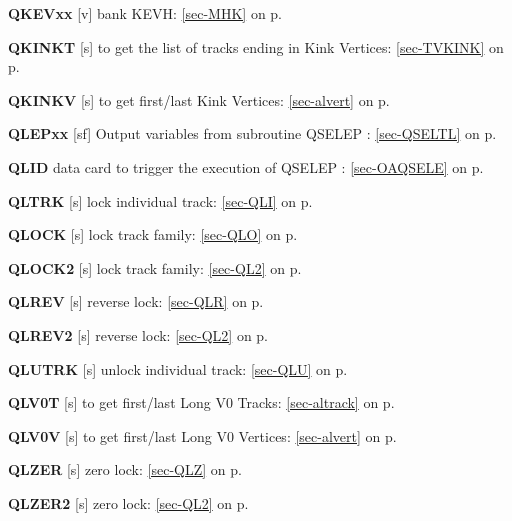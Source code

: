  \item{\bf QKEVxx  }[v] bank KEVH: \ref{sec-MHK} on p.~\pageref{sec-MHK}
 
 \item{\bf QKINKT  }[s] to get the list of tracks ending in Kink Vertices: \ref{sec-TVKINK} on p.~\pageref{sec-TVKINK}
 
 \item{\bf QKINKV  }[s] to get first/last Kink Vertices: \ref{sec-alvert} on p.~\pageref{sec-alvert}
 
 \item{\bf QLEPxx  }[sf] Output variables from subroutine QSELEP : \ref{sec-QSELTL} on p.~\pageref{sec-QSELTL}\\
 \item{\bf QLID } data card to trigger the execution of QSELEP : \ref{sec-OAQSELE} on p.~\pageref{sec-OAQSELE}\\
 \item{\bf QLTRK   }[s] lock individual track: \ref{sec-QLI} on p.~\pageref{sec-QLI}\\
 \item{\bf QLOCK   }[s] lock track family: \ref{sec-QLO} on p.~\pageref{sec-QLO}\\
 \item{\bf QLOCK2  }[s] lock track family: \ref{sec-QL2} on p.~\pageref{sec-QL2}\\
 \item{\bf QLREV   }[s] reverse lock: \ref{sec-QLR} on p.~\pageref{sec-QLR}\\
 \item{\bf QLREV2  }[s] reverse lock: \ref{sec-QL2} on p.~\pageref{sec-QL2}\\
 \item{\bf QLUTRK  }[s] unlock individual track: \ref{sec-QLU} on p.~\pageref{sec-QLU}\\
 \item{\bf QLV0T   }[s] to get first/last Long V0 Tracks: \ref{sec-altrack} on p.~\pageref{sec-altrack}\\
 \item{\bf QLV0V   }[s] to get first/last Long V0 Vertices: \ref{sec-alvert} on p.~\pageref{sec-alvert}
 
 \item{\bf QLZER   }[s] zero lock: \ref{sec-QLZ} on p.~\pageref{sec-QLZ}\\
 \item{\bf QLZER2  }[s] zero lock: \ref{sec-QL2} on p.~\pageref{sec-QL2}
 
